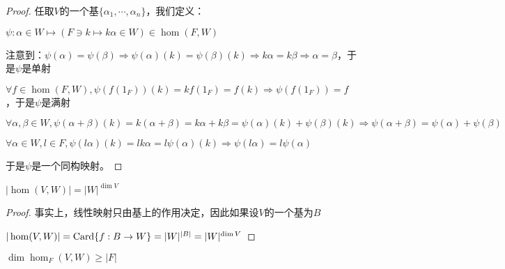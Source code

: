 \documentclass[12pt, a4paper, oneside, UTF8]{ctexbook}
\begin{document}
			\begin{proof}
				任取$V$的一个基$\{\alpha_1,\cdots,\alpha_n\}$，我们定义：

				$\psi : \alpha \in W \mapsto \left(F \ni k \mapsto k\alpha \in W\right) \in \hom(F,W)$

				注意到：$\psi  (\alpha )=\psi  (\beta ) \Rightarrow \psi  (\alpha )(k)=\psi  (\beta )(k) \Rightarrow k\alpha =k\beta \Rightarrow \alpha =\beta $，于是$\psi  $是单射

				$\forall f \in \hom(F,W),\psi  (f(1_F))(k)=kf(1_F)=f(k)\Rightarrow \psi  (f(1_F))=f$，于是$\psi $是满射

				$\forall \alpha ,\beta \in W,\psi (\alpha +\beta )(k)=k(\alpha +\beta )=k\alpha +k\beta =\psi (\alpha )(k)+\psi (\beta )(k) \Rightarrow \psi (\alpha +\beta )=\psi (\alpha )+\psi (\beta )$

				$\forall \alpha \in W,l \in F,\psi (l\alpha )(k)=lk\alpha =l\psi (\alpha )(k) \Rightarrow \psi (l\alpha )=l\psi (\alpha )$

				于是$\psi $是一个同构映射。
			\end{proof}
			\begin{lemma}{}{}
				$|\hom(V,W)|=|W|^{\dim V}$
			\end{lemma}
			\begin{proof}
				事实上，线性映射只由基上的作用决定，因此如果设$V$的一个基为$B$

				$|\hom(V,W)|=\operatorname{Card} \{f:B \to W\}=|W|^{|B|}=|W|^{\dim V}$
			\end{proof}
			\begin{lemma}{}{}
				$\dim \hom_F (V,W) \geqslant |F|$
			\end{lemma}
\end{document}
